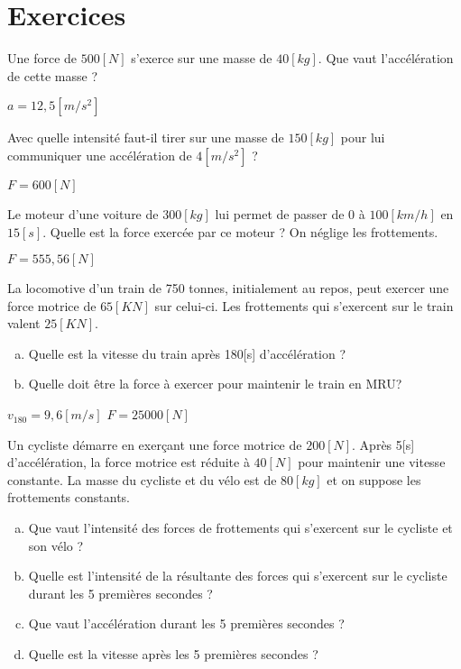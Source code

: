 \section{Exercices}
\begin{exercise}
    Une force de \(500[N]\) s'exerce sur une masse de \(40[kg]\). Que vaut l'accélération de cette masse ?
\end{exercise}
\begin{solution}
    \(a=12,5[m/s^2]\)
\end{solution}


\begin{exercise}
    Avec quelle intensité faut-il tirer sur une masse de \(150[kg]\) pour lui communiquer une accélération de \(4[m/s^2]\) ?
\end{exercise}
\begin{solution}
    \(F=600[N]\)
\end{solution}

\begin{exercise}
    Le moteur d'une voiture de \(300[kg]\) lui permet de passer de 0 à \(100[km/h]\) en \(15[s]\). Quelle est la force exercée par ce moteur ? On néglige les frottements.
\end{exercise}
\begin{solution}
    \(F=555,56[N]\)
\end{solution}

\begin{exercise}
    La locomotive d'un train de 750 tonnes, initialement au repos, peut exercer une force motrice de \(65[KN]\) sur celui-ci. Les frottements qui s'exercent sur le train valent \(25[KN]\).
    \begin{enumerate}[a)]
        \item Quelle est la vitesse du train après 180[s] d'accélération ?
        \item Quelle doit être la force à exercer pour maintenir le train en MRU?
    \end{enumerate}
\end{exercise}
\begin{solution}
    \(v_{180}=9,6[m/s]\)
    \(F=25000[N]\)
\end{solution}

\begin{exercise}
    Un cycliste démarre en exerçant une force motrice de \(200[N]\). Après 5[s] d'accélération, la force motrice est réduite à \(40[N]\) pour maintenir une vitesse constante. La masse du cycliste et du vélo est de \(80[kg]\) et on suppose les frottements constants.
    \begin{enumerate}[a)]
        \item Que vaut l'intensité des forces de frottements qui s'exercent sur le cycliste et son vélo ?
        \item Quelle est l'intensité de la résultante des forces qui s'exercent sur le cycliste durant les 5 premières secondes ?
        \item Que vaut l'accélération durant les 5 premières secondes ?
        \item Quelle est la vitesse après les 5 premières secondes ?
    \end{enumerate}
\end{exercise}

